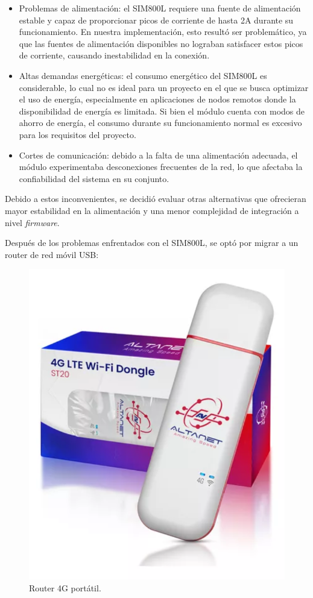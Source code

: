 \begin{itemize}
    \item Problemas de alimentación: el SIM800L requiere una fuente de alimentación estable y capaz de proporcionar picos de corriente de hasta 2A durante su funcionamiento. En nuestra implementación, esto resultó ser problemático, ya que las fuentes de alimentación disponibles no lograban satisfacer estos picos de corriente, causando inestabilidad en la conexión.
    
    \item Altas demandas energéticas: el consumo energético del SIM800L es considerable, lo cual no es ideal para un proyecto en el que se busca optimizar el uso de energía, especialmente en aplicaciones de nodos remotos donde la disponibilidad de energía es limitada. Si bien el módulo cuenta con modos de ahorro de energía, el consumo durante su funcionamiento normal es excesivo para los requisitos del proyecto.
    
    \item Cortes de comunicación: debido a la falta de una alimentación adecuada, el módulo experimentaba desconexiones frecuentes de la red, lo que afectaba la confiabilidad del sistema en su conjunto.
\end{itemize}

Debido a estos inconvenientes, se decidió evaluar otras alternativas que ofrecieran mayor estabilidad en la alimentación y una menor complejidad de integración a nivel \textit{firmware}.

Después de los problemas enfrentados con el SIM800L, se optó por migrar a un router de red móvil USB:

\begin{figure}[H]
    \centering
    \includegraphics[width=0.6\linewidth]{Figures//Hardware//Modulos/dongle.png}
    \caption{Router 4G portátil.}
    \label{fig:enter-label}
\end{figure}

